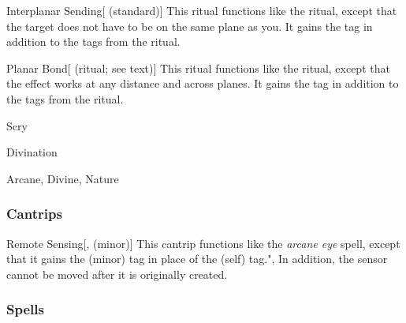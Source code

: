 \lowercase{\hypertarget{spell:Interplanar Sending}{}}\label{spell:Interplanar Sending}
\begin{apability}[\nth{6}]{\hypertarget{spell:Interplanar Sending}{Interplanar Sending}}[ (standard)]
This ritual functions like the  ritual, except that the target does not have to be on the same plane as you.
It gains the  tag in addition to the tags from the  ritual.
\end{apability}
\vspace{0.25em}



\lowercase{\hypertarget{spell:Planar Bond}{}}\label{spell:Planar Bond}
\begin{attuneability}[\nth{7}]{\hypertarget{spell:Planar Bond}{Planar Bond}}[ (ritual; see text)]
This ritual functions like the  ritual, except that the effect works at any distance and across planes.
It gains the  tag in addition to the tags from the  ritual.
\end{attuneability}
\vspace{0.25em}


\newpage
\begin{spellsection}{Scry}

\begin{spellheader}
\end{spellheader}


 Divination

 Arcane, Divine, Nature

\subsubsection{Cantrips}


\begin{freeability}{Remote Sensing}[,  (minor)]
This cantrip functions like the \textit{arcane eye} spell, except that it gains the  (minor) tag in place of the  (self) tag.",
In addition, the sensor cannot be moved after it is originally created.
\end{freeability}

\end{spellsection}


\subsubsection{Spells}


